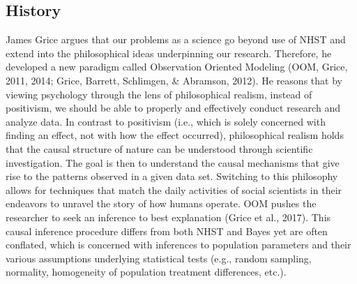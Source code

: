 \documentclass[,man, mask]{apa6}
\theoremstyle{definition}
\theoremstyle{definition}
\theoremstyle{definition}
\theoremstyle{remark}
\begin{document}
\subsection{History}\label{history-2}

James Grice argues that our problems as a science go beyond use of NHST
and extend into the philosophical ideas underpinning our research.
Therefore, he developed a new paradigm called Observation Oriented
Modeling (OOM, Grice, 2011, 2014; Grice, Barrett, Schlimgen, \&
Abramson, 2012). He reasons that by viewing psychology through the lens
of philosophical realism, instead of positivism, we should be able to
properly and effectively conduct research and analyze data. In contrast
to positivism (i.e., which is solely concerned with finding an effect,
not with how the effect occurred), philosophical realism holds that the
causal structure of nature can be understood through scientific
investigation. The goal is then to understand the causal mechanisms that
give rise to the patterns observed in a given data set. Switching to
this philosophy allows for techniques that match the daily activities of
social scientists in their endeavors to unravel the story of how humans
operate. OOM pushes the researcher to seek an inference to best
explanation (Grice et al., 2017). This causal inference procedure
differs from both NHST and Bayes yet are often conflated, which is
concerned with inferences to population parameters and their various
assumptions underlying statistical tests (e.g., random sampling,
normality, homogeneity of population treatment differences, etc.).
\end{document}
